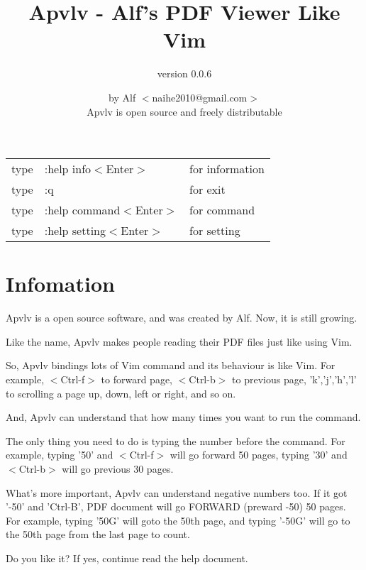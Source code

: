 \documentclass[a4paper,12pt]{article}
\begin{document}
\large

\title{Apvlv - Alf's PDF Viewer Like Vim}
\author{version 0.0.6}
\date{by Alf $<$naihe2010@gmail.com$>$ \\Apvlv is open source and freely distributable}
\maketitle{}

\begin{center}
\begin{tabular}{lll}
type & :help info$<$Enter$>$      & for information \\
type & :q                         & for exit \\
type & :help command$<$Enter$>$   & for command \\
type & :help setting$<$Enter$>$   & for setting \\
\end{tabular}
\end{center}

\newpage

\section{Infomation}

Apvlv is a open source software, and was created by Alf. Now, it is still growing.

Like the name, Apvlv makes people reading their PDF files just like using Vim.

So, Apvlv bindings lots of Vim command and its behaviour is like Vim. For example, $<$Ctrl-f$>$ to forward page, $<$Ctrl-b$>$ to previous page, 'k','j','h','l' to scrolling a page up, down, left or right, and so on. 

And, Apvlv can understand that how many times you want to run the command.

The only thing you need to do is typing the number before the command. For example, typing '50' and $<$Ctrl-f$>$ will go forward 50 pages, typing '30' and $<$Ctrl-b$>$ will go previous 30 pages.

What's more important, Apvlv can understand negative numbers too. If it got '-50' and 'Ctrl-B', PDF document will go FORWARD (preward -50) 50 pages. For example, typing '50G' will goto the 50th page, and typing '-50G' will go to the 50th page from the last page to count.

Do you like it? If yes, continue read the help document.
\end{document}
